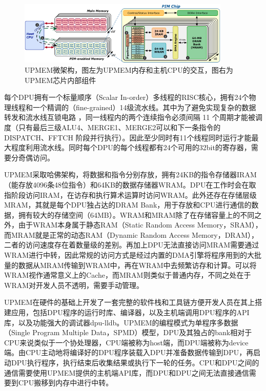 \begin{figure}[!htbp]
	\centering
    \includegraphics[width=0.9\textwidth]{figures/UPMEMArch.png}
    \caption{UPMEM微架构，图左为UPMEM内存和主机CPU的交互，图右为UPMEM芯片内部组件}
	\label{UPMEMArch}
\end{figure}

每个DPU拥有一个标量顺序（Scalar In-order）多线程的RISC核心，拥有24个物理线程和一个精调的（fine-grained）14级流水线。其中为了避免实现复杂的数据转发和流水线互锁电路 \cite{UPMEMHotChips}，同一线程内的两个连续指令必须间隔 11 个周期才能被调度（只有最后三级ALU4、MERGE1、MERGE2可以和下一条指令的 DISPATCH、FFTCH 阶段并行执行）。因此至少同时有11个线程同时运行才能最大程度利用流水线。同时每个DPU的每个线程都有24个可用的32bit的寄存器，需要分奇偶访问。

UPMEM采取哈佛架构，将数据和指令分别存放，拥有24KB的指令存储器IRAM（能存放4096条48位指令）和64KB的数据存储器WRAM。DPU在工作时会在取指阶段访问IRAM，在访存和执行算术运算时访问WRAM。此外还存在存储层级MRAM，其就是每个DPU独占达的DRAM Bank，用于存放和CPU进行通信的数据，拥有较大的存储空间（64MB）。WRAM和MRAM除了在存储容量上的不同之外，由于WRAM本身属于静态RAM（Static Random Access Memory，SRAM），而MRAM就是正常的动态RAM（Dynamic Random Access Memory，DRAM），二者的访问速度存在着数量级的差别。再加上DPU无法直接访问MRAM需要通过WRAM进行中转，因此常规的访问方式是经过内置的DMA引擎将程序用到的大批量的数据从MRAM传输到WRAM中，再在WRAM中去频繁访存和计算。可以将WRAM视作通常意义上的Cache，而MRAM则类似于普通内存，不同之处在于WRAM对开发人员不透明，需要手动管理。

UPMEM在硬件的基础上开发了一套完整的软件栈和工具链方便开发人员在其上搭建应用，包括DPU程序的运行时库、编译器，以及主机端调用DPU程序的API库，以及功能强大的调试器dpu-lldb。UPMEM的编程模式为单程序多数据（Single Program Multiple Data，SPMD）模型，DPU及其独占的bank相对于CPU来说类似于一个协处理器，CPU端被称为host端，而DPU端被称为device端。由CPU主动地将编译好的DPU程序装载入DPU并准备数据传输到DPU，再启动DPU执行程序，执行结束后收集结果或执行下一轮的任务。CPU和DPU之间的通信需要使用UPMEM提供的主机端API库，而DPU和DPU之间无法直接通信需要到CPU搬移到内存中进行中转。

